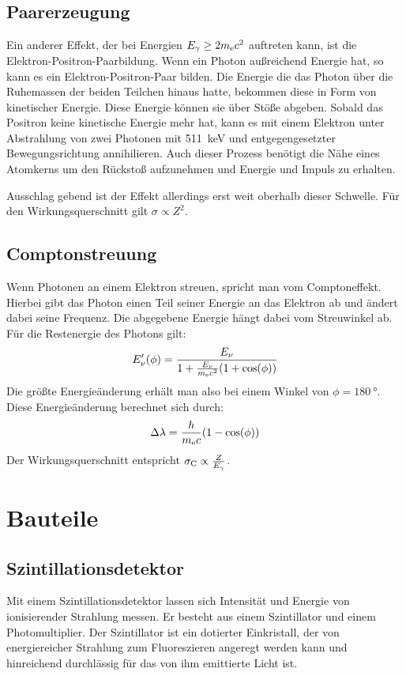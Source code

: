 \documentclass[11pt, ngerman, fleqn, DIV=15, headinclude, BCOR=2cm]{scrreprt}
\begin{document}
\subsection{Paarerzeugung}

Ein anderer Effekt, der bei Energien $E_\gamma \ge 2m_\text ec^2$ auftreten
kann, ist die Elektron-Positron-Paarbildung. Wenn ein Photon außreichend
Energie hat, so kann es ein Elektron-Positron-Paar bilden. Die Energie die das
Photon über die Ruhemassen der beiden Teilchen hinaus hatte, bekommen diese in
Form von kinetischer Energie. Diese Energie können sie über Stöße abgeben.
Sobald das Positron keine kinetische Energie mehr hat, kann es mit einem
Elektron unter Abstrahlung von zwei Photonen mit \SI{511}{\kilo\electronvolt}
und entgegengesetzter Bewegungsrichtung annihilieren. Auch dieser Prozess
benötigt die Nähe eines Atomkerns um den Rückstoß aufzunehmen und Energie
und Impuls zu erhalten.

Ausschlag gebend ist der Effekt allerdings erst weit oberhalb dieser Schwelle.
Für den Wirkungsquerschnitt gilt $\sigma \propto Z^2$.

\subsection{Comptonstreuung}
Wenn Photonen an einem Elektron streuen, spricht man vom Comptoneffekt. 
Hierbei gibt das Photon einen Teil seiner Energie an das Elektron ab und ändert dabei
seine Frequenz.%
Die abgegebene Energie hängt dabei vom Streuwinkel ab.
Für die Restenergie des Photons gilt:
\[
    E_\nu'(\phi) = \frac{E_\nu}{1+\frac{E_\nu}{m_\text ec^2}(1+\cos(\phi))}
\]
Die größte Energieänderung erhält man also bei einem Winkel von
$\phi=\SI{180}{\degree}$.
Diese Energieänderung berechnet sich durch:
\[
    \Delta\lambda = \frac{h}{m_\text ec}(1-\cos(\phi))
\]
Der Wirkungsquerschnitt entspricht $\sigma_\text C \propto \frac{Z}{E_\gamma}$.

\section{Bauteile}
\subsection{Szintillationsdetektor}

Mit einem Szintillationsdetektor lassen sich Intensität und Energie von
ionisierender Strahlung messen.
Er besteht aus einem Szintillator und einem Photomultiplier.
Der Szintillator ist ein dotierter Einkristall, der von energiereicher
Strahlung zum Fluoreszieren angeregt werden kann und hinreichend
durchlässig für das von ihm emittierte Licht ist.
\end{document}
